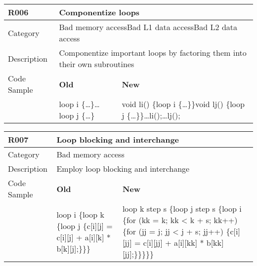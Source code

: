 \begin{tabular}{|p{0.9in}|p{2.0in}|p{2.0in}|} \hline
\textbf{R006}       & \multicolumn{2}{|p{4.0in}|}{\textbf{Componentize loops}} \\ \hline
Category            & \multicolumn{2}{|p{4.0in}|}{Bad memory access\newline Bad L1 data access\newline Bad L2 data access} \\ \hline
Description         & \multicolumn{2}{|p{4.0in}|}{Componentize important loops by factoring them into their own subroutines} \\ \hline
Code Sample         & \textbf{Old} & \textbf{New} \\ \hline
                    & loop i \{\ldots\}\newline \ldots\newline loop j \{\ldots\}
                    & void li() \{loop i \{\ldots\}\}\newline void lj() \{loop j \{\ldots\}\}\newline \ldots\newline li();\newline \ldots\newline lj(); \\ \hline
\end{tabular}

\begin{tabular}{|p{0.9in}|p{2.0in}|p{2.0in}|} \hline
\textbf{R007}       & \multicolumn{2}{|p{4.0in}|}{\textbf{Loop blocking and interchange}} \\ \hline
Category            & \multicolumn{2}{|p{4.0in}|}{Bad memory access} \\ \hline
Description         & \multicolumn{2}{|p{4.0in}|}{Employ loop blocking and interchange} \\ \hline
Code Sample         & \textbf{Old} & \textbf{New} \\ \hline
                    & loop i \{\newline   loop k \{\newline     loop j \{\newline       c[i][j] = c[i][j] + a[i][k] * b[k][j];\newline     \}\newline   \}\newline \}
                    & loop k step s \{\newline   loop j step s \{\newline     loop i \{\newline       for (kk = k; kk <{} k + s; kk++) \{\newline         for (jj = j; jj <{} j + s; jj++) \{\newline           c[i][jj] = c[i][jj] + a[i][kk] * b[kk][jj];\newline         \}\newline       \}\newline     \}\newline   \}\newline \} \\ \hline
\end{tabular}

